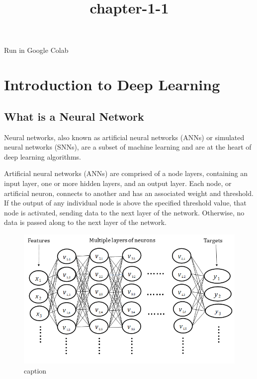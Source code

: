 \documentclass[11pt]{article}
\title{chapter-1-1}
\begin{document}
    
    \maketitle
    
    

    
    Run in Google Colab

    \hypertarget{introduction-to-deep-learning}{%
\section{Introduction to Deep
Learning}\label{introduction-to-deep-learning}}

    \hypertarget{what-is-a-neural-network}{%
\subsection{What is a Neural Network}\label{what-is-a-neural-network}}

Neural networks, also known as artificial neural networks (ANNs) or
simulated neural networks (SNNs), are a subset of machine learning and
are at the heart of deep learning algorithms.

Artificial neural networks (ANNs) are comprised of a node layers,
containing an input layer, one or more hidden layers, and an output
layer. Each node, or artificial neuron, connects to another and has an
associated weight and threshold. If the output of any individual node is
above the specified threshold value, that node is activated, sending
data to the next layer of the network. Otherwise, no data is passed
along to the next layer of the network.

    \begin{figure}
\centering
\includegraphics{./pic/chapter-5-1_pic_0.png}
\caption{caption}
\end{figure}
\end{document}

